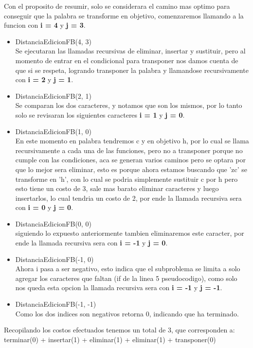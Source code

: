 Con el proposito de resumir, solo se considerara el camino mas optimo para conseguir que la palabra se transforme en objetivo, comenzaremos llamando a la funcion con \textbf{i = 4} y \textbf{j = 3}.
\begin{itemize}
    \item DistanciaEdicionFB(4, 3)\\Se ejecutaran las llamadas recursivas de eliminar, insertar y sustituir, pero al momento de entrar en el condicional para transponer nos damos cuenta de que si se respeta, logrando transponer la palabra y llamandose recursivamente con \textbf{i = 2} y \textbf{j = 1}.
    \item DistanciaEdicionFB(2, 1)\\Se comparan los dos caracteres, y notamos que son los mismos, por lo tanto solo se revisaran los siguientes caracteres \textbf{i = 1} y \textbf{j = 0}.
    \item DistanciaEdicionFB(1, 0)\\En este momento en palabra tendremos c y en objetivo h, por lo cual se llama recursivamente a cada una de las funciones, pero no a transponer porque no cumple con las condiciones, aca se generan varios caminos pero se optara por que lo mejor sera eliminar, esto es porque ahora estamos buscando que 'zc' se transforme en 'h', con lo cual se podria simplemente sustituir c por h pero esto tiene un costo de 3, sale mas barato eliminar caracteres y luego insertarlos, lo cual tendria un costo de 2, por ende la llamada recursiva sera con \textbf{i = 0} y \textbf{j = 0}.
    \item DistanciaEdicionFB(0, 0)\\siguiendo lo expuesto anteriormente tambien eliminaremos este caracter, por ende la llamada recursiva sera con \textbf{i = -1} y \textbf{j = 0}.
    \item DistanciaEdicionFB(-1, 0)\\Ahora i pasa a ser negativo, esto indica que el subproblema se limita a solo agregar los caracteres que faltan (if de la linea 5 pseudocodigo), como solo nos queda esta opcion  la llamada recursiva sera con \textbf{i = -1} y \textbf{j = -1}.
    \item DistanciaEdicionFB(-1, -1)\\Como los dos indices son negativos retorna 0, indicando que ha terminado.
\end{itemize}
Recopilando los costos efectuados tenemos un total de 3, que corresponden a:\\
terminar(0) + insertar(1) + eliminar(1) + eliminar(1) + transponer(0)